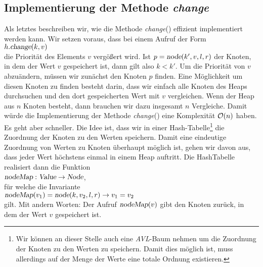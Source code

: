 \subsection{Implementierung der Methode \textsl{change}}
Als letztes beschreiben wir, wie die Methode \textsl{change}() effizient implementiert werden kann.
Wir setzen voraus, dass bei einem Aufruf der Form \\[0.1cm]
\hspace*{1.3cm} $h.\textsl{change}(k,v)$ \\[0.1cm]
die Priorit\"at des Elements $v$ verg\"o{\ss}ert wird.  Ist $p = \textsl{node}(k',v,l,r)$ der Knoten,
in dem der Wert $v$ gespeichert ist, dann gilt also $k < k'$.  Um die Priorit\"at von $v$
abzu\"andern, m\"ussen wir zun\"achst den Knoten $p$ finden.  Eine M\"oglichkeit um diesen Knoten
zu finden besteht darin, dass wir einfach alle Knoten des Heaps durchsuchen und den dort
gespeicherten Wert mit $v$ vergleichen.  Wenn der Heap aus  $n$ Knoten besteht,
dann brauchen wir dazu insgesamt $n$ Vergleiche.  Damit w\"urde die Implementierung der Methode
\textsl{change}() eine Komplexit\"at $\mathcal{O}(n)$ haben.  Es geht aber schneller.  Die Idee ist,
dass wir in einer Hash-Tabelle\footnote{Wir k\"onnen an dieser Stelle auch eine
  \textsl{AVL}-Baum nehmen um die Zuordnung der Knoten zu den Werten zu speichern.
Damit dies m\"oglich ist, muss allerdings auf der Menge der Werte eine totale Ordnung existieren.
}
 die Zuordnung der Knoten zu den Werten speichern.  
Damit eine eindeutige Zuordnung von Werten zu Knoten \"uberhaupt m\"oglich ist, gehen wir
davon aus, dass jeder Wert h\"ochstens einmal in einem Heap auftritt.
Die HashTabelle realisiert dann die Funktion \\[0.1cm]
\hspace*{1.3cm} $\textsl{nodeMap}: \textsl{Value} \rightarrow \textsl{Node}$, \\[0.1cm]
f\"ur welche die Invariante \\[0.1cm]
\hspace*{1.3cm} $\textsl{nodeMap}(v_1) = \textsl{node}(k,v_2,l,r) \rightarrow v_1 = v_2$ \\[0.1cm]
gilt. Mit andern Worten: Der Aufruf $\textsl{nodeMap}(v)$ gibt den Knoten zur\"uck, in dem
der Wert $v$ gespeichert ist.  

